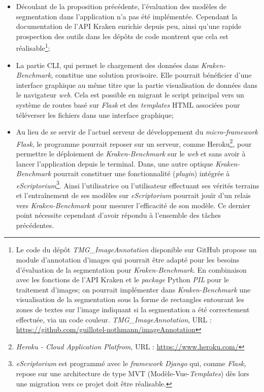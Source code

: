 \begin{itemize}
    \item Découlant de la proposition précédente, l'évaluation des modèles de segmentation dans l'application n'a pas été implémentée. Cependant la documentation de l'API Kraken enrichie depuis peu, ainsi qu'une rapide prospection des outils dans les dépôts de code montrent que cela est réalisable\footnote{Le code du dépôt \textit{TMG\_ImageAnnotation} disponible sur GitHub propose un module d'annotation d'images qui pourrait être adapté pour les besoins d'évaluation de la segmentation pour \textit{Kraken-Benchmark}. En combinaison avec les fonctions de l'API Kraken et le \textit{package} Python \textit{PIL} pour le traitement d'images; on pourrait implémenter dans \textit{Kraken-Benchmark} une visualisation de la segmentation sous la forme de rectangles entourant les zones de textes sur l'image indiquant si la segmentation a été correctement effectuée, via un code couleur. \textit{TMG\_ImageAnnotation}, URL : \url{https://github.com/guillotel-nothmann/imageAnnotation}};
    \item La partie CLI, qui permet le chargement des données dans \textit{Kraken-Benchmark}, constitue une solution provisoire. Elle pourrait bénéficier d'une interface graphique au même titre que la partie visualisation de données dans le navigateur \textit{web}. Cela est possible en migrant le script principal  vers un système de routes basé sur \textit{Flask} et des \textit{templates} HTML associées pour téléverser les fichiers dans une interface graphique;
    \item Au lieu de se servir de l'actuel serveur de développement du \textit{micro-framework Flask}, le programme pourrait reposer sur un serveur, comme Heroku\footnote{\textit{Heroku - Cloud Application Platfrom}, URL : \url{https://www.heroku.com/}}, pour permettre le déploiement de \textit{Kraken-Benchmark} sur le \textit{web} et sans avoir à lancer l'application depuis le terminal. Dans, une autre optique \textit{Kraken-Benchmark} pourrait constituer une fonctionnalité (\textit{plugin}) intégrée à \textit{eScriptorium}\footnote{\textit{eScriptorium} est programmé avec le \textit{framework Django} qui, comme \textit{Flask}, repose sur une architecture de type MVT (Modèle-Vue-\textit{Templates}) dès lors une migration vers ce projet doit être réalisable.}. Ainsi l'utilisatrice ou l'utilisateur effectuant ses vérités terrains et l'entraînement de ses modèles sur \textit{eScriptorium} pourrait jouïr d'un relais vers \textit{Kraken-Benchmark} pour mesurer l'efficacité de son modèle. Ce dernier point nécessite cependant d'avoir répondu à l'ensemble des tâches précédentes.
\end{itemize}

